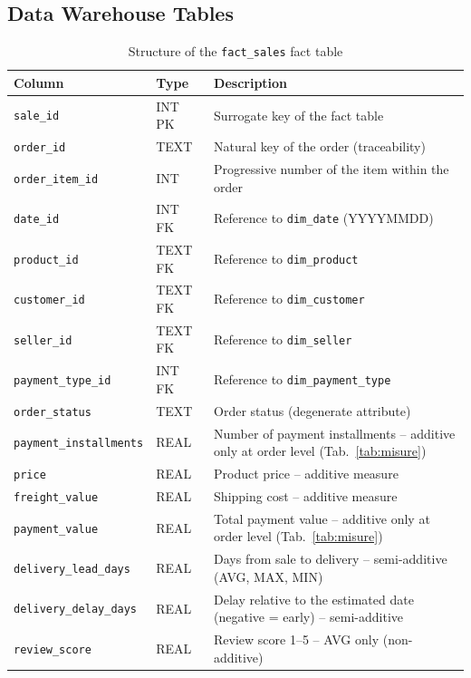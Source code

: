 \documentclass[12pt,a4paper]{article}
\begin{document}
\subsection{Data Warehouse Tables}

\begin{table}[H]
  \centering
  \caption{Structure of the \texttt{fact\_sales} fact table}
  \label{tab:fact}
  \begin{tabular}{lll}
    \toprule
    \textbf{Column} & \textbf{Type} & \textbf{Description} \\
    \midrule
    \texttt{sale\_id}             & INT PK   & Surrogate key of the fact table \\
    \texttt{order\_id}            & TEXT     & Natural key of the order (traceability) \\
    \texttt{order\_item\_id}      & INT      & Progressive number of the item within the order \\
    \texttt{date\_id}             & INT FK   & Reference to \texttt{dim\_date} (YYYYMMDD) \\
    \texttt{product\_id}          & TEXT FK  & Reference to \texttt{dim\_product} \\
    \texttt{customer\_id}         & TEXT FK  & Reference to \texttt{dim\_customer} \\
    \texttt{seller\_id}           & TEXT FK  & Reference to \texttt{dim\_seller} \\
    \texttt{payment\_type\_id}    & INT FK   & Reference to \texttt{dim\_payment\_type} \\
    \texttt{order\_status}        & TEXT     & Order status (degenerate attribute) \\
    \texttt{payment\_installments} & REAL    & Number of payment installments -- additive only at order level (Tab.~\ref{tab:misure}) \\
    \texttt{price}                & REAL     & Product price -- additive measure \\
    \texttt{freight\_value}       & REAL     & Shipping cost -- additive measure \\
    \texttt{payment\_value}       & REAL     & Total payment value -- additive only at order level (Tab.~\ref{tab:misure}) \\
    \texttt{delivery\_lead\_days} & REAL     & Days from sale to delivery -- semi-additive (AVG, MAX, MIN) \\
    \texttt{delivery\_delay\_days} & REAL    & Delay relative to the estimated date (negative = early) -- semi-additive \\
    \texttt{review\_score}        & REAL     & Review score 1--5 -- AVG only (non-additive) \\
    \bottomrule
  \end{tabular}
\end{table}
\end{document}
